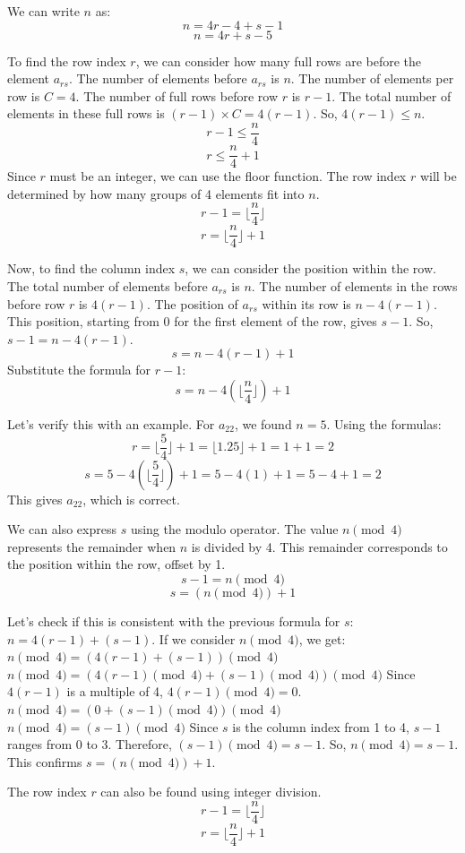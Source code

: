 \documentclass{article}
\begin{document}
We can write $n$ as:
$$ n = 4r - 4 + s - 1 $$
$$ n = 4r + s - 5 $$

To find the row index $r$, we can consider how many full rows are before the element $a_{rs}$.
The number of elements before $a_{rs}$ is $n$.
The number of elements per row is $C=4$.
The number of full rows before row $r$ is $r-1$.
The total number of elements in these full rows is $(r-1) \times C = 4(r-1)$.
So, $4(r-1) \le n$.
$$ r-1 \le \frac{n}{4} $$
$$ r \le \frac{n}{4} + 1 $$
Since $r$ must be an integer, we can use the floor function. The row index $r$ will be determined by how many groups of 4 elements fit into $n$.
$$ r-1 = \lfloor \frac{n}{4} \rfloor $$
$$ r = \lfloor \frac{n}{4} \rfloor + 1 $$

Now, to find the column index $s$, we can consider the position within the row.
The total number of elements before $a_{rs}$ is $n$.
The number of elements in the rows before row $r$ is $4(r-1)$.
The position of $a_{rs}$ within its row is $n - 4(r-1)$.
This position, starting from 0 for the first element of the row, gives $s-1$.
So, $s-1 = n - 4(r-1)$.
$$ s = n - 4(r-1) + 1 $$
Substitute the formula for $r-1$:
$$ s = n - 4 \left( \lfloor \frac{n}{4} \rfloor \right) + 1 $$

Let's verify this with an example. For $a_{22}$, we found $n=5$.
Using the formulas:
$$ r = \lfloor \frac{5}{4} \rfloor + 1 = \lfloor 1.25 \rfloor + 1 = 1 + 1 = 2 $$
$$ s = 5 - 4(\lfloor \frac{5}{4} \rfloor) + 1 = 5 - 4(1) + 1 = 5 - 4 + 1 = 2 $$
This gives $a_{22}$, which is correct.

We can also express $s$ using the modulo operator. The value $n \pmod 4$ represents the remainder when $n$ is divided by 4. This remainder corresponds to the position within the row, offset by 1.
$$ s-1 = n \pmod 4 $$
$$ s = (n \pmod 4) + 1 $$

Let's check if this is consistent with the previous formula for $s$:
$n = 4(r-1) + (s-1)$.
If we consider $n \pmod 4$, we get:
$n \pmod 4 = (4(r-1) + (s-1)) \pmod 4$
$n \pmod 4 = (4(r-1) \pmod 4 + (s-1) \pmod 4) \pmod 4$
Since $4(r-1)$ is a multiple of 4, $4(r-1) \pmod 4 = 0$.
$n \pmod 4 = (0 + (s-1) \pmod 4) \pmod 4$
$n \pmod 4 = (s-1) \pmod 4$
Since $s$ is the column index from 1 to 4, $s-1$ ranges from 0 to 3. Therefore, $(s-1) \pmod 4 = s-1$.
So, $n \pmod 4 = s-1$.
This confirms $s = (n \pmod 4) + 1$.

The row index $r$ can also be found using integer division.
$$ r-1 = \lfloor \frac{n}{4} \rfloor $$
$$ r = \lfloor \frac{n}{4} \rfloor + 1 $$
\end{document}
